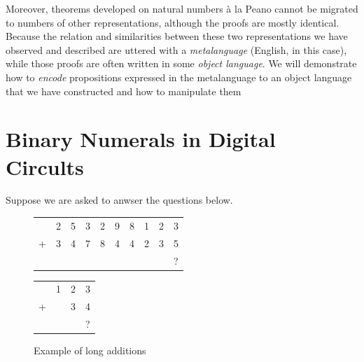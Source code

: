 \documentclass[\main/thesis.tex]{subfiles}
\begin{document}
Moreover, theorems developed on natural numbers à la Peano cannot be migrated
to numbers of other representations, although the proofs are mostly identical.
Because the relation and similarities between these two representations we have
observed and described are uttered with a \textit{metalanguage} (English, in
this case), while those proofs are often written in some \textit{object language}.
We will demonstrate how to \textit{encode} propositions expressed in the
metalanguage to an object language that we have constructed and how to manipulate
them

\section{Binary Numerals in Digital Circults}

Suppose we are asked to anwser the questions below.

\begin{figure}[H]
    \vspace{15pt}
    \noindent\begin{minipage}{.45\textwidth}
        \begin{center}
            \begin{tabular}{c@{\,}c@{\,}c@{\,}c@{\,}c@{\,}c@{\,}c@{\,}c@{\,}c@{\,}c}
              & 2 & 5 & 3 & 2 & 9 & 8 & 1 & 2 & 3 \\
            + & 3 & 4 & 7 & 8 & 4 & 4 & 2 & 3 & 5 \\
            \hline
              &   &   &   &   &   &   &   &   & ? \\
            \end{tabular}
        \end{center}
    \end{minipage}\hfill
    \begin{minipage}{.48\textwidth}
        \begin{center}
            \begin{tabular}{c@{\,}c@{\,}c@{\,}c}
                  & 1 & 2 & 3 \\
                + &   & 3 & 4 \\
                \hline
                  &   &   & ? \\
            \end{tabular}
        \end{center}
    \end{minipage}
    \vspace{15pt}
\caption{Example of long additions}
\label{figure:1}
\end{figure}
\end{document}
